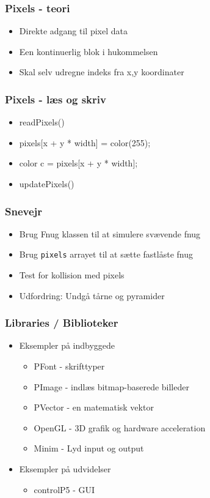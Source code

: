 \documentclass{beamer}
\begin{document}
\begin{frame}[fragile]
  \frametitle{Pixels - teori}
  \begin{itemize}
  \item Direkte adgang til pixel data
  \item Een kontinuerlig blok i hukommelsen
  \item Skal selv udregne indeks fra x,y koordinater
  \end{itemize}
\end{frame}

\begin{frame}[fragile]
  \frametitle{Pixels - læs og skriv}
  \begin{itemize}
  \item readPixels()
  \item pixels[x + y * width] = color(255);
  \item color c = pixels[x + y * width];
  \item updatePixels()
  \end{itemize}
\end{frame}

\begin{frame}[fragile]
  \frametitle{Snevejr}
  \begin{itemize}
  \item Brug Fnug klassen til at simulere svævende fnug
  \item Brug \texttt{pixels} arrayet til at sætte fastlåste fnug
  \item Test for kollision med pixels
  \item Udfordring: Undgå tårne og pyramider
  \end{itemize}
\end{frame}


\begin{frame}
  \frametitle{Libraries / Biblioteker}
  \begin{itemize}
  \item Eksempler på indbyggede
    \begin{itemize}
    \item PFont - skrifttyper
    \item PImage - indlæs bitmap-baserede billeder
    \item PVector - en matematisk vektor
    \item OpenGL - 3D grafik og hardware acceleration
    \item Minim - Lyd input og output
    \end{itemize}
  \item Eksempler på udvidelser
    \begin{itemize}
    \item controlP5 - GUI
    \end{itemize}
  \end{itemize}
\end{frame}
\end{document}
